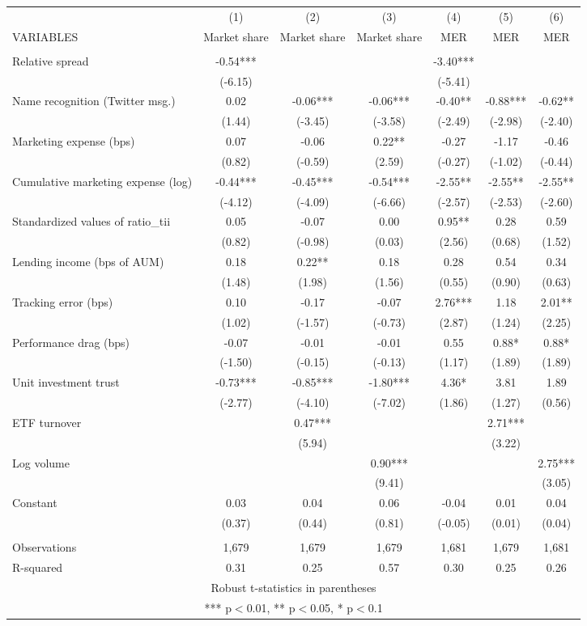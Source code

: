 \documentclass[]{article}
\begin{document}
\begin{tabular}{lcccccc} \hline
 & (1) & (2) & (3) & (4) & (5) & (6) \\
VARIABLES & Market share & Market share & Market share & MER & MER & MER \\ \hline
 &  &  &  &  &  &  \\
Relative spread & -0.54*** &  &  & -3.40*** &  &  \\
 & (-6.15) &  &  & (-5.41) &  &  \\
Name recognition (Twitter msg.) & 0.02 & -0.06*** & -0.06*** & -0.40** & -0.88*** & -0.62** \\
 & (1.44) & (-3.45) & (-3.58) & (-2.49) & (-2.98) & (-2.40) \\
Marketing expense (bps) & 0.07 & -0.06 & 0.22** & -0.27 & -1.17 & -0.46 \\
 & (0.82) & (-0.59) & (2.59) & (-0.27) & (-1.02) & (-0.44) \\
Cumulative marketing expense (log) & -0.44*** & -0.45*** & -0.54*** & -2.55** & -2.55** & -2.55** \\
 & (-4.12) & (-4.09) & (-6.66) & (-2.57) & (-2.53) & (-2.60) \\
Standardized values of ratio\_tii & 0.05 & -0.07 & 0.00 & 0.95** & 0.28 & 0.59 \\
 & (0.82) & (-0.98) & (0.03) & (2.56) & (0.68) & (1.52) \\
Lending income (bps of AUM) & 0.18 & 0.22** & 0.18 & 0.28 & 0.54 & 0.34 \\
 & (1.48) & (1.98) & (1.56) & (0.55) & (0.90) & (0.63) \\
Tracking error (bps) & 0.10 & -0.17 & -0.07 & 2.76*** & 1.18 & 2.01** \\
 & (1.02) & (-1.57) & (-0.73) & (2.87) & (1.24) & (2.25) \\
Performance drag (bps) & -0.07 & -0.01 & -0.01 & 0.55 & 0.88* & 0.88* \\
 & (-1.50) & (-0.15) & (-0.13) & (1.17) & (1.89) & (1.89) \\
Unit investment trust & -0.73*** & -0.85*** & -1.80*** & 4.36* & 3.81 & 1.89 \\
 & (-2.77) & (-4.10) & (-7.02) & (1.86) & (1.27) & (0.56) \\
ETF turnover &  & 0.47*** &  &  & 2.71*** &  \\
 &  & (5.94) &  &  & (3.22) &  \\
Log volume &  &  & 0.90*** &  &  & 2.75*** \\
 &  &  & (9.41) &  &  & (3.05) \\
Constant & 0.03 & 0.04 & 0.06 & -0.04 & 0.01 & 0.04 \\
 & (0.37) & (0.44) & (0.81) & (-0.05) & (0.01) & (0.04) \\
 &  &  &  &  &  &  \\
Observations & 1,679 & 1,679 & 1,679 & 1,681 & 1,679 & 1,681 \\
 R-squared & 0.31 & 0.25 & 0.57 & 0.30 & 0.25 & 0.26 \\ \hline
\multicolumn{7}{c}{ Robust t-statistics in parentheses} \\
\multicolumn{7}{c}{ *** p$<$0.01, ** p$<$0.05, * p$<$0.1} \\
\end{tabular}
\end{document}
